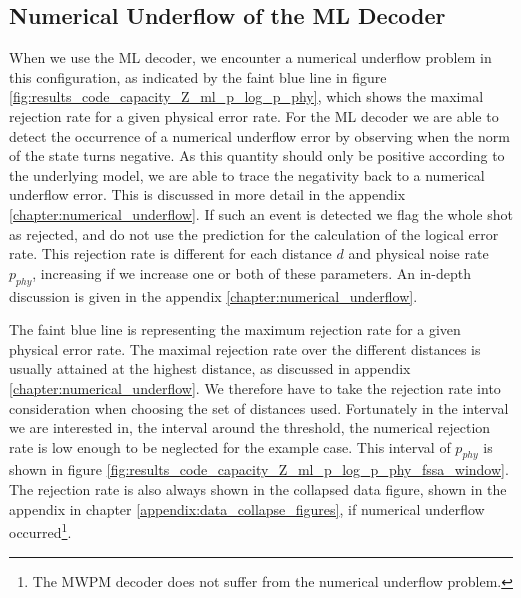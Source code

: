 \subsection{Numerical Underflow of the ML Decoder}

When we use the ML decoder, we encounter a numerical underflow problem in this configuration, as indicated by the faint blue line in figure \ref{fig:results_code_capacity_Z_ml_p_log_p_phy},
which shows the maximal rejection rate for a given physical error rate.
For the ML decoder we are able to detect the occurrence of a numerical underflow error by observing when the norm of the state turns negative. 
As this quantity should only be positive according to the underlying model, we are able to trace the negativity back to a numerical underflow error.
This is discussed in more detail in the appendix \ref{chapter:numerical_underflow}.
If such an event is detected we flag the whole shot as rejected, and do not use the prediction for the calculation of the logical error rate.
This rejection rate is different for each distance $d$ and physical noise rate $p_{phy}$, increasing if we increase one or both of these parameters. 
An in-depth discussion is given in the appendix \ref{chapter:numerical_underflow}. 

The faint blue line is representing the maximum rejection rate for a given physical error rate.
The maximal rejection rate over the different distances is usually attained at the highest distance, as discussed in appendix \ref{chapter:numerical_underflow}.
We therefore have to take the rejection rate into consideration when choosing the set of distances used.
Fortunately in the interval we are interested in, the interval around the threshold, 
the numerical rejection rate is low enough to be neglected for the example case.
This interval of $p_{phy}$ is shown in figure \ref{fig:results_code_capacity_Z_ml_p_log_p_phy_fssa_window}.
The rejection rate is also always shown in the collapsed data figure, shown in the appendix in chapter \ref{appendix:data_collapse_figures}, 
if numerical underflow occurred\footnote{ 
    The MWPM decoder does not suffer from the numerical underflow problem. 
}.


